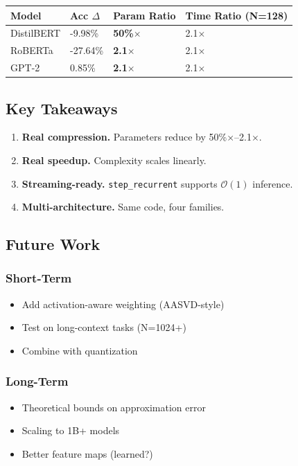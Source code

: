 \begin{table}[H]
\centering
\small
\begin{tabular}{llll}
\toprule
\textbf{Model} & \textbf{Acc $\Delta$} & \textbf{Param Ratio} & \textbf{Time Ratio (N=128)} \\
\midrule
DistilBERT & -9.98\% & \textbf{50\%$\times$} & 2.1$\times$ \\
RoBERTa & -27.64\% & \textbf{2.1$\times$} & 2.1$\times$ \\
GPT-2 & 0.85\% & \textbf{2.1$\times$} & 2.1$\times$ \\
\bottomrule
\end{tabular}
\end{table}

\subsection{Key Takeaways}

\begin{enumerate}
\item \textbf{Real compression.} Parameters reduce by 50\%$\times$--2.1$\times$.
\item \textbf{Real speedup.} Complexity scales linearly.
\item \textbf{Streaming-ready.} \texttt{step\_recurrent} supports $\mathcal{O}(1)$ inference.
\item \textbf{Multi-architecture.} Same code, four families.

\end{enumerate}
\subsection{Future Work}

\subsubsection{Short-Term}
\begin{itemize}
\item Add activation-aware weighting (AASVD-style)
\item Test on long-context tasks (N=1024+)
\item Combine with quantization

\end{itemize}
\subsubsection{Long-Term}
\begin{itemize}
\item Theoretical bounds on approximation error
\item Scaling to 1B+ models
\item Better feature maps (learned?)

\end{itemize}
